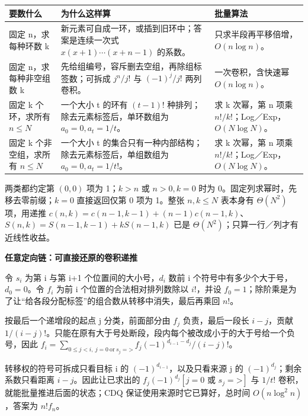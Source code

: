 \begin{tabularx}{\linewidth}{>{\raggedright\arraybackslash}p{28mm}>{\raggedright\arraybackslash}X >{\raggedright\arraybackslash}p{40mm}}\toprule
要数什么 & 为什么这样算 & 批量算法\\\midrule
固定 n，求每种环数 k & 新元素可自成一环，或插到旧环中；答案是连续一次式 \(x(x+1)\cdots(x+n-1)\) 的系数。 & 只求半段再平移倍增，\(O(n\log n)\)。\\
固定 n，求每种非空组数 k & 先给组编号，容斥删去空组，再除组标签数；可拆成 \(j^n/j!\) 与 \((-1)^j/j!\) 两列卷积。 & 一次卷积，含快速幂 \(O(n\log n)\)。\\
固定 k 个环，求所有 \(n\le N\) & 一个大小 t 的环有 \((t-1)!\) 种排列；除去元素标签后，单环数组为 \(a_0=0,a_t=1/t\)。 & 求 k 次幂，第 n 项乘 \(n!/k!\)；Log／Exp，\(O(N\log N)\)。\\
固定 k 个非空组，求所有 \(n\le N\) & 一个大小 t 的集合只有一种内部结构；除去元素标签后，单组数组为 \(a_0=0,a_t=1/t!\)。 & 求 k 次幂，第 n 项乘 \(n!/k!\)；Log／Exp，\(O(N\log N)\)。\\
\bottomrule\end{tabularx}\par\vspace{5pt}
两类都约定第 \((0,0)\) 项为 1；\(k>n\) 或 \(n>0,k=0\) 时为 0。固定列求幂时，先移去零前缀；\(k=0\) 直接返回仅第 0 项为 1。整张 \(n,k\le N\) 表本身有 \(\Theta(N^2)\) 项，用递推 \(c(n,k)=c(n-1,k-1)+(n-1)c(n-1,k)\)、\(S(n,k)=S(n-1,k-1)+kS(n-1,k)\) 已是 \(\Theta(N^2)\)；只算一行／列才有近线性收益。\par\vspace{5pt}
\vspace{5pt}\textbf{\color{Accent}任意定向链：可直接还原的卷积递推}\par
令 \(s_i\) 为第 i 与第 i+1 个位置间的大小号，\(d_i\) 数前 i 个符号中有多少个大于号，\(d_0=0\)。令 \(f_i\) 为前 i 个位置的合法相对排列数除以 \(i!\)，并设 \(f_0=1\)；除阶乘是为了让“给各段分配标签”的组合数从转移中消失，最后再乘回 \(n!\)。\par
按最后一个递增段的起点 j 分类，前面部分由 \(f_j\) 负责，最后一段长 \(i-j\)，贡献 \(1/(i-j)!\)。只能在原有大于号处断段，段内每个被改成小于的大于号给一个负号，因此 \(f_i=\sum_{0\le j<i,\ j=0\ \mathrm{or}\ s_j=\texttt{>}}f_j(-1)^{d_{i-1}-d_j}/(i-j)!\)。\par
转移权的符号可拆成只看目标 i 的 \((-1)^{d_{i-1}}\)，以及只看来源 j 的 \((-1)^{d_j}\)；剩余系数只看距离 \(i-j\)。因此让已求出的 \(f_j(-1)^{d_j}[j=0\text{ 或 }s_j=\texttt{>}]\) 与 \(1/t!\) 卷积，就能批量推进后面的状态；CDQ 保证使用来源时它已算好，总时间 \(O(n\log^2n)\)，答案为 \(n!f_n\)。
\endgroup
